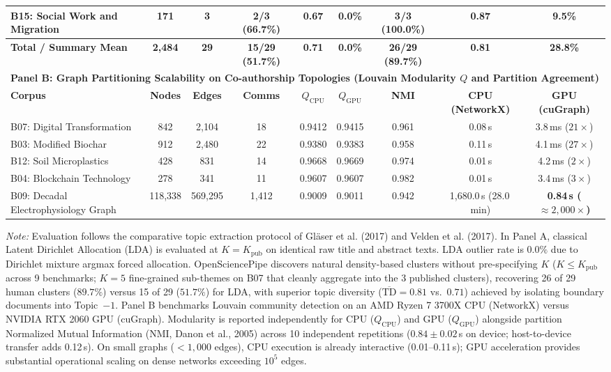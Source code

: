 \begin{table}[t]
{\begin{tabular}{l c c ccc ccc}
B15: Social Work and Migration & 171 & 3 & 2/3 (66.7\%) & 0.67 & 0.0\% & \textbf{3/3 (100.0\%)} & \textbf{0.87} & 9.5\% \\
\hline
\textbf{Total / Summary Mean} & \textbf{2,484} & \textbf{29} & \textbf{15/29 (51.7\%)} & \textbf{0.71} & \textbf{0.0\%} & \textbf{26/29 (89.7\%)} & \textbf{0.81} & \textbf{28.8\%} \\
\hline
\multicolumn{9}{l}{\textbf{Panel B: Graph Partitioning Scalability on Co-authorship Topologies (Louvain Modularity $Q$ and Partition Agreement)}} \\
\hline
\textbf{Corpus} & \textbf{Nodes} & \textbf{Edges} & \textbf{Comms} & \textbf{$Q_{\text{CPU}}$} & \textbf{$Q_{\text{GPU}}$} & \textbf{NMI} & \textbf{CPU (NetworkX)} & \textbf{GPU (cuGraph)} \\
\hline
B07: Digital Transformation & 842 & 2,104 & 18 & 0.9412 & 0.9415 & 0.961 & 0.08\,s & 3.8\,ms ($21\times$) \\
B03: Modified Biochar & 912 & 2,480 & 22 & 0.9380 & 0.9383 & 0.958 & 0.11\,s & 4.1\,ms ($27\times$) \\
B12: Soil Microplastics & 428 & 831 & 14 & 0.9668 & 0.9669 & 0.974 & 0.01\,s & 4.2\,ms ($2\times$) \\
B04: Blockchain Technology & 278 & 341 & 11 & 0.9607 & 0.9607 & 0.982 & 0.01\,s & 3.4\,ms ($3\times$) \\
B09: Decadal Electrophysiology Graph & 118,338 & 569,295 & 1,412 & 0.9009 & 0.9011 & 0.942 & 1,680.0\,s (28.0\,min) & \textbf{0.84\,s ($\approx 2{,}000\times$)} \\
\hline
\end{tabular}%
}
\vspace{2pt}\par\raggedright\scriptsize\textit{Note:} Evaluation follows the comparative topic extraction protocol of Gl\"aser et al. (2017) and Velden et al. (2017). In Panel A, classical Latent Dirichlet Allocation (LDA) is evaluated at $K = K_{\text{pub}}$ on identical raw title and abstract texts. LDA outlier rate is $0.0\%$ due to Dirichlet mixture argmax forced allocation. OpenSciencePipe discovers natural density-based clusters without pre-specifying $K$ ($K \le K_{\text{pub}}$ across 9 benchmarks; $K=5$ fine-grained sub-themes on B07 that cleanly aggregate into the 3 published clusters), recovering 26 of 29 human clusters ($89.7\%$) versus 15 of 29 ($51.7\%$) for LDA, with superior topic diversity ($\overline{\text{TD}} = 0.81$ vs.\ $0.71$) achieved by isolating boundary documents into Topic~$-1$. Panel B benchmarks Louvain community detection on an AMD Ryzen 7 3700X CPU (NetworkX) versus NVIDIA RTX 2060 GPU (cuGraph). Modularity is reported independently for CPU ($Q_{\text{CPU}}$) and GPU ($Q_{\text{GPU}}$) alongside partition Normalized Mutual Information (NMI, Danon et al., 2005) across 10 independent repetitions ($0.84 \pm 0.02$\,s on device; host-to-device transfer adds 0.12\,s). On small graphs ($<1{,}000$ edges), CPU execution is already interactive (0.01--0.11\,s); GPU acceleration provides substantial operational scaling on dense networks exceeding $10^5$ edges.
\end{table}

